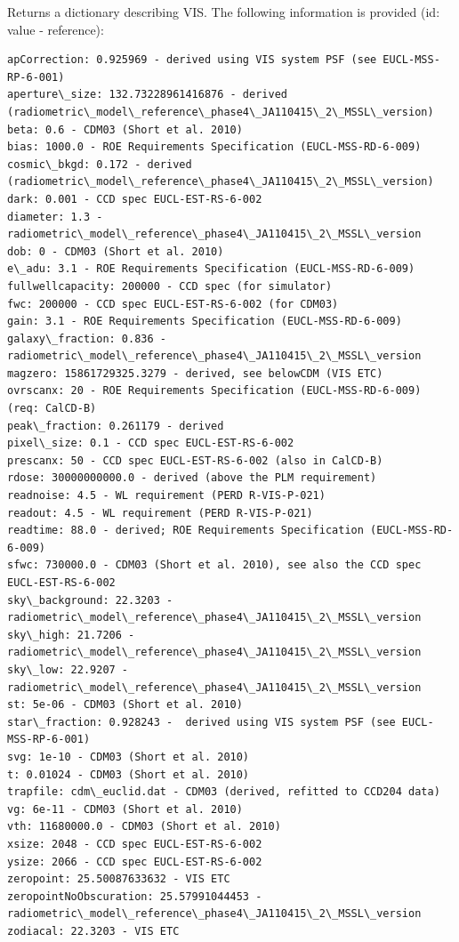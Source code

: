 \documentclass[a4paper,11pt,english]{sphinxmanual}
\begin{document}
\begin{fulllineitems}
\label{instrument:support.VISinstrumentModel.VISinformation}
Returns a dictionary describing VIS. The following information is provided (id: value - reference):

\begin{Verbatim}[commandchars=\\\{\}]
apCorrection: 0.925969 - derived using VIS system PSF (see EUCL-MSS-RP-6-001)
aperture\_size: 132.73228961416876 - derived (radiometric\_model\_reference\_phase4\_JA110415\_2\_MSSL\_version)
beta: 0.6 - CDM03 (Short et al. 2010)
bias: 1000.0 - ROE Requirements Specification (EUCL-MSS-RD-6-009)
cosmic\_bkgd: 0.172 - derived  (radiometric\_model\_reference\_phase4\_JA110415\_2\_MSSL\_version)
dark: 0.001 - CCD spec EUCL-EST-RS-6-002
diameter: 1.3 - radiometric\_model\_reference\_phase4\_JA110415\_2\_MSSL\_version
dob: 0 - CDM03 (Short et al. 2010)
e\_adu: 3.1 - ROE Requirements Specification (EUCL-MSS-RD-6-009)
fullwellcapacity: 200000 - CCD spec (for simulator)
fwc: 200000 - CCD spec EUCL-EST-RS-6-002 (for CDM03)
gain: 3.1 - ROE Requirements Specification (EUCL-MSS-RD-6-009)
galaxy\_fraction: 0.836 - radiometric\_model\_reference\_phase4\_JA110415\_2\_MSSL\_version
magzero: 15861729325.3279 - derived, see belowCDM (VIS ETC)
ovrscanx: 20 - ROE Requirements Specification (EUCL-MSS-RD-6-009) (req: CalCD-B)
peak\_fraction: 0.261179 - derived
pixel\_size: 0.1 - CCD spec EUCL-EST-RS-6-002
prescanx: 50 - CCD spec EUCL-EST-RS-6-002 (also in CalCD-B)
rdose: 30000000000.0 - derived (above the PLM requirement)
readnoise: 4.5 - WL requirement (PERD R-VIS-P-021)
readout: 4.5 - WL requirement (PERD R-VIS-P-021)
readtime: 88.0 - derived; ROE Requirements Specification (EUCL-MSS-RD-6-009)
sfwc: 730000.0 - CDM03 (Short et al. 2010), see also the CCD spec EUCL-EST-RS-6-002
sky\_background: 22.3203 - radiometric\_model\_reference\_phase4\_JA110415\_2\_MSSL\_version
sky\_high: 21.7206 - radiometric\_model\_reference\_phase4\_JA110415\_2\_MSSL\_version
sky\_low: 22.9207 - radiometric\_model\_reference\_phase4\_JA110415\_2\_MSSL\_version
st: 5e-06 - CDM03 (Short et al. 2010)
star\_fraction: 0.928243 -  derived using VIS system PSF (see EUCL-MSS-RP-6-001)
svg: 1e-10 - CDM03 (Short et al. 2010)
t: 0.01024 - CDM03 (Short et al. 2010)
trapfile: cdm\_euclid.dat - CDM03 (derived, refitted to CCD204 data)
vg: 6e-11 - CDM03 (Short et al. 2010)
vth: 11680000.0 - CDM03 (Short et al. 2010)
xsize: 2048 - CCD spec EUCL-EST-RS-6-002
ysize: 2066 - CCD spec EUCL-EST-RS-6-002
zeropoint: 25.50087633632 - VIS ETC
zeropointNoObscuration: 25.57991044453 - radiometric\_model\_reference\_phase4\_JA110415\_2\_MSSL\_version
zodiacal: 22.3203 - VIS ETC
\end{Verbatim}


\end{fulllineitems}
\end{document}
